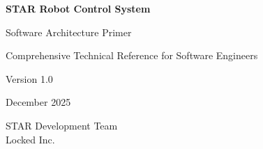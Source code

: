 \documentclass[11pt,letterpaper]{article}
\begin{document}

\begin{titlepage}
    \centering
    \vspace*{2cm}

    {\Huge\bfseries STAR Robot Control System\par}
    \vspace{0.5cm}
    {\LARGE Software Architecture Primer\par}
    \vspace{1cm}
    {\Large Comprehensive Technical Reference for Software Engineers\par}

    \vfill

    {\large Version 1.0\par}
    {\large December 2025\par}

    \vfill

    {\normalsize STAR Development Team\\
    Locked Inc.\par}
\end{titlepage}

\tableofcontents
\newpage



\newpage


\newpage


\newpage


\newpage


\newpage


\newpage


\newpage


\newpage
\end{document}
